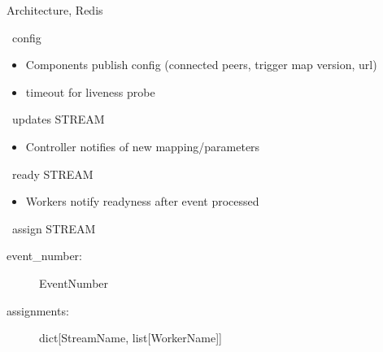 \documentclass[aspectratio=169]{beamer}
\begin{document}
\begin{frame}{Architecture, Redis}
 \begin{block}{\faDatabase\ config}
  \begin{itemize}
   \item Components publish config (connected peers, trigger map version, url)
   \item timeout for liveness probe
  \end{itemize}
 \end{block}
 
 \begin{block}{\faDatabase\ updates STREAM}
  \begin{itemize}
   \item Controller notifies of new mapping/parameters
  \end{itemize}
 \end{block}
 
 \begin{block}{\faDatabase\ ready STREAM}
  \begin{itemize}
   \item Workers notify readyness after event processed
  \end{itemize}
 \end{block}
 
 \begin{block}{\faDatabase\ assign STREAM}
  \begin{description}
   \item[event\_number:] EventNumber
   \item[assignments:] dict[StreamName, list[WorkerName]]
  \end{description}

 \end{block}

\end{frame}
\end{document}
